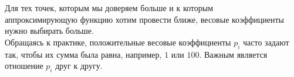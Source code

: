 \documentclass[a4paper,11pt]{article}
\begin{document}
Для тех точек, которым мы доверяем больше и к которым \\ аппроксимирующую функцию хотим провести ближе,
весовые коэффициенты нужно выбирать больше. \\
Обращаясь к практике, положительные весовые коэффициенты $p_i$ часто задают так, чтобы их сумма была равна, например, $1$ или $100$.
Важным является отношение $p_i$ друг к другу.
\end{document}
